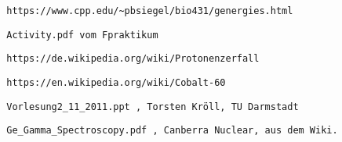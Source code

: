 \documentclass[]{article}
\begin{document}
	\newpage
	\begin{thebibliography}{}
		\begin{verbatim}
		https://www.cpp.edu/~pbsiegel/bio431/genergies.html
		\end{verbatim}	
		\begin{verbatim}
		Activity.pdf vom Fpraktikum
		\end{verbatim}
		
		 \begin{verbatim}
		https://de.wikipedia.org/wiki/Protonenzerfall
		\end{verbatim}
		
		 \begin{verbatim}
		https://en.wikipedia.org/wiki/Cobalt-60
		\end{verbatim}
		
		\begin{verbatim}
		Vorlesung2_11_2011.ppt , Torsten Kröll, TU Darmstadt
		\end{verbatim}  
		
		\begin{verbatim}
		Ge_Gamma_Spectroscopy.pdf , Canberra Nuclear, aus dem Wiki.
		\end{verbatim}  
		
	\end{thebibliography}
\end{document}
